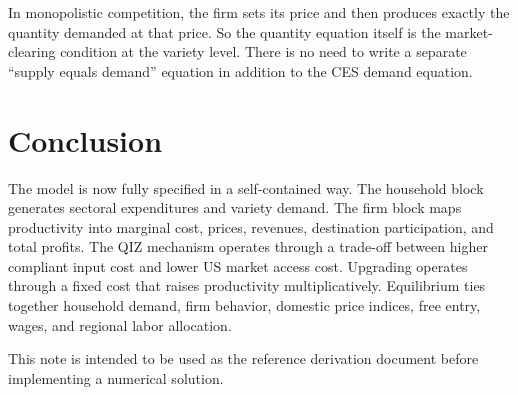 \documentclass[11pt]{article}
\begin{document}
In monopolistic competition, the firm sets its price and then produces exactly the quantity demanded at that price. So the quantity equation itself is the market-clearing condition at the variety level. There is no need to write a separate ``supply equals demand'' equation in addition to the CES demand equation.

\section{Conclusion}

The model is now fully specified in a self-contained way. The household block generates sectoral expenditures and variety demand. The firm block maps productivity into marginal cost, prices, revenues, destination participation, and total profits. The QIZ mechanism operates through a trade-off between higher compliant input cost and lower US market access cost. Upgrading operates through a fixed cost that raises productivity multiplicatively. Equilibrium ties together household demand, firm behavior, domestic price indices, free entry, wages, and regional labor allocation.

This note is intended to be used as the reference derivation document before implementing a numerical solution.
\end{document}
